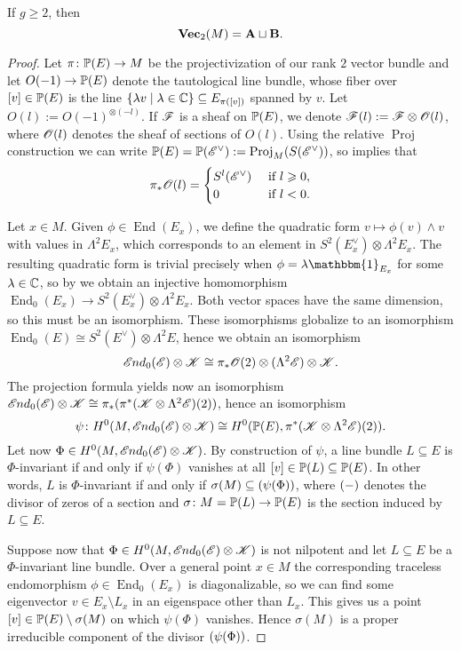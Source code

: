 \documentclass[A4paper, 12pt, british, reqno]{amsart}
\DeclareMathOperator{\End}{End}
\DeclareMathOperator{\Proj}{Proj}
\let\div\relax
\DeclareMathOperator{\div}{div}
\newcommand{\ot}{\otimes}
\newcommand{\dual}{^{\vee}}
\newcommand{\1}{\mathbbm{1}}
\begin{document}
\begin{lm}\label{lm:twocases}
    If $g\geqslant 2$, then
    \[ \Vec_{2}(M)=\bfA\sqcup \bfB. \]
    \begin{proof}
	Let $\pi\colon \P(E)\to M$ be the projectivization of our rank $2$ vector bundle and let $O(-1)\to \P(E)$ denote the tautological line bundle, whose fiber over $[v]\in \P(E)$ is the line $\{\lambda v\mid \lambda\in \C\}\subseteq E_{\pi([v])}$ spanned by $v$.
	Let $O(l):=O(-1)^{\ot (-l)}$.
	If $\F$ is a sheaf on $\P(E)$, we denote $\F(l):=\F\ot \O(l)$, where $\O(l)$ denotes the sheaf of sections of $O(l)$.
	Using the relative $\Proj$ construction we can write $\P(E)=\P(\E\dual):=\Proj_{M}(S(\E\dual))$, so \cite[Exercise III.8.4]{har77} implies that
	\[ \pi_{*}\O(l)=\begin{cases} S^{l}(\E\dual) & \text{ if } l\geqslant 0, \\
	    0 & \text{ if }l<0.
	\end{cases}
	\]

	Let $x\in M$.
	Given $\phi\in \End(E_{x})$, we define the quadratic form $v\mapsto \phi(v)\wedge v$ with values in $\Lambda^{2}E_{x}$, which corresponds to an element in $S^{2}(E_{x}\dual)\ot\Lambda^{2}E_{x}$.
	The resulting quadratic form is trivial precisely when $\phi=\lambda\1_{E_{x}}$ for some $\lambda\in \C$, so by  we obtain an injective homomorphism $\End_{0}(E_{x})\to S^{2}(E_{x}\dual)\ot \Lambda^{2}E_{x}$.
	Both vector spaces have the same dimension, so this must be an isomorphism.
	These isomorphisms globalize to an isomorphism $\End_{0}(E)\cong S^{2}(E\dual)\ot \Lambda^{2}E$, hence we obtain an isomorphism
	\[ \sEnd_{0}(\E)\ot \sK\cong \pi_{*}\O(2)\ot (\Lambda^{2}\E)\ot \sK. \]
	The projection formula yields now an isomorphism $\sEnd_{0}(\E)\ot \sK\cong \pi_{*}(\pi^{*}(\sK\ot \Lambda^{2}\E)(2))$, hence an isomorphism
	\[ \psi \colon H^{0}(M,\sEnd_{0}(\E)\ot \sK)\cong H^{0}(\P(E),\pi^{*}(\sK\ot \Lambda^{2}\E)(2)). \]
	Let now $\Phi\in H^{0}(M,\sEnd_{0}(\E)\ot \sK)$.
	By construction of $\psi$, a line bundle $L\subseteq E$ is $\Phi$-invariant if and only if $\psi(\Phi)$ vanishes at all $[v]\in \P(L)\subseteq \P(E)$.
	In other words, $L$ is $\Phi$-invariant if and only if $\sigma(M)\subseteq \div(\psi(\Phi))$, where $\div(-)$ denotes the divisor of zeros of a section and $\sigma\colon M=\P(L)\to \P(E)$ is the section induced by $L\subseteq E$.

	Suppose now that $\Phi\in H^{0}(M,\sEnd_{0}(\E)\ot \sK)$ is not nilpotent and let $L\subseteq E$ be a $\Phi$-invariant line bundle.
	Over a general point $x\in M$ the corresponding traceless endomorphism $\phi\in \End_{0}(E_{x})$ is diagonalizable, so we can find some eigenvector $v\in E_{x}\setminus L_{x}$ in an eigenspace other than $L_{x}$.
	This gives us a point $[v]\in \P(E)\setminus \sigma(M)$ on which $\psi(\Phi)$ vanishes.
	Hence $\sigma(M)$ is a proper irreducible component of the divisor $\div(\psi(\Phi))$.


\end{proof}
\end{lm}
\end{document}
